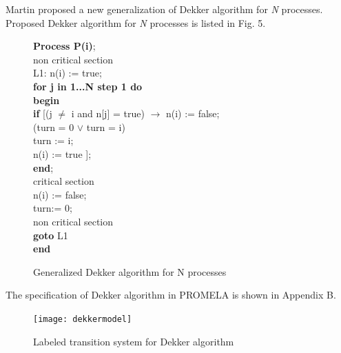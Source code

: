 \documentclass[conference]{IEEEtran}
\begin{document}
Martin \cite{14} proposed a new generalization of Dekker algorithm for \emph{N} processes. Proposed Dekker algorithm for \emph{N} processes is listed 
in Fig. 5.
\begin{figure}[!ht]
\hspace{.2cm}\textbf{Process P(i)};\\
\hspace*{.3cm}non critical section\\
\hspace*{.3cm}L1: n(i) := true;\\
\hspace*{.4cm}\textbf{for j in 1...N step 1 do}\\
\hspace*{.5cm}\textbf{begin}\\
\hspace*{.6cm}\textbf{if} [(j $\neq$ i and n[j] =  true) $\rightarrow$ n(i) := false;\\
\hspace*{4cm}(turn = 0 $\lor$ turn = i)\\
\hspace*{.6cm}turn := i;\\
\hspace*{.6cm}n(i) := true ];\\
\hspace*{.5cm}\textbf{end};\\
\hspace*{.3cm} critical section\\
\hspace*{.3cm}n(i) := false;\\
\hspace*{.3cm}turn:= 0;\\
\hspace*{.3cm}non critical section\\
\hspace*{.3cm}\textbf{goto} L1\\
\hspace*{.2cm}\textbf{end}
\caption{Generalized Dekker algorithm for N processes}
\end{figure}

The specification of Dekker algorithm in PROMELA is shown in Appendix B. 
\begin{figure}[!ht]
\centering\texttt{[image: dekkermodel]}
\caption{Labeled transition system for Dekker algorithm} 
\end{figure}
\end{document}
